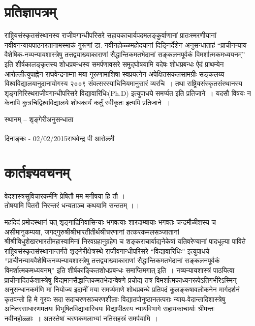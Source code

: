 \chapter{प्रतिज्ञापत्रम्}
\begin{small}
राष्ट्रियसंस्कृतसंस्थानस्य राजीवगान्धीपरिसरे सहायकाचार्यपदमलङ्कुर्वाणानां प्रातःस्मरणीयानां नवीवनन्यायपाठनरतानामस्माकं गुरूणां डा. नवीनहोळ्ळमहोदयानां दिङ्निर्देशेन अनुसन्धाताहं “प्राचीनन्याय-वैशेषिक-नव्यन्यायशास्त्रेषु तत्तद्व्याख्याकाराणां सैद्धान्तिकमतभेदानां सङ्कलनपूर्वकं विमर्शात्मकमध्ययनम्” इति शीर्षकालङ्कृतस्य शोधप्रबन्धस्य समर्पणावसरे समुद्घोषयामि यदेषः शोधप्रबन्धः ऐदं प्राथम्येन आरोल्लीत्युपाह्वेन राघवेन्द्रनाम्ना  मया गूरूणामाशिषा स्वप्रयत्नेन अपेक्षितसकलसामग्रीः सङ्कलय्य विश्वविद्यालयानुदानायोगस्य २००९ संवत्सरस्याधिनियमानुसारं व्यरचि~। तथा राष्ट्रियसंस्कृतसंस्थानस्य शृङ्गगिरिस्थराजीवगान्धीपरिसरे विद्यावारिधिः(Ph.D) इत्युपाधये समर्प्यत इति प्रतिजाने~। यदसौ विषयः न केनापि कुत्रचिद्विश्वविद्यालये शोधकार्यं कर्तुं स्वीकृतः इत्यपि प्रतिजाने~।
\bigskip

\noindent									
स्थानम् – शृङ्गेरी\hfill अनुसन्धाता\\ \\
दिनाङ्कः - 02/02/2015\hfill {\s राघवेन्द्र पी आरोल्ली}

\end{small}

\chapter{कार्तज्ञ्यवचनम्}

{\s वेदशास्त्रसुविचारकर्मणि प्रेषितौ मम मनीषया हि तौ ।\\
तोषयामि पितरौ निरन्तरं धन्यताञ्च कथयामि सन्ततम् ।।}

महदिदं प्रमोदस्थानं यत् शृङ्गाद्रिनिवासिन्याः भगवत्याः शारदाम्बायाः भगवतः चन्द्रमौळीशस्य च असीमानुकम्पया, जगद्गुरुश्रीश्रीभारतीतीर्थश्रीचरणानां तत्करकमलसञ्जातानां श्रीश्रीविधुशेखरभारतीमहास्वामिनां निरवग्रहानुग्रहेण च शङ्कराचार्याद्यनेकेषां यतिवरेण्यानां पादधूल्या पाविते राष्ट्रियसंस्कृतसंस्थानान्तर्गते शृङ्गेरीक्षेत्रस्थे राजीवगान्धीपरिसरे “विद्यावारिधिः” इत्युपाधये 	“प्राचीनन्यायवैशेषिकनव्यन्यायशास्त्रेषु तत्तद्व्याख्याकाराणां सैद्धान्तिकमतभेदानां सङ्कलनपूर्वकं विमर्शात्मकमध्ययनम्” इति शीर्षकाङ्कितशोधप्रबन्धः समाप्तिमगात् इति~। नव्यन्यायशास्त्रं पाठयित्वा प्राचीनादितर्कशास्त्रेषु विद्यमानसैद्धान्तिकमतभेदान्वेषणे प्रचोद्य तत्र विमर्शात्मकाध्यनरूपेऽतिगभीरेऽस्मिन्  अनुसन्धानकर्मणि  मां नियोज्य इदानीं मया समर्प्यमाणे शोधप्रबन्धे प्रतिपदं कूलङ्कषावलोकनेन मार्गदर्शनं कृतवन्तो हि मे गुरवः सदा सदाचरणसञ्चरणशीलाः विद्यातपोनुष्ठानतत्पराः न्याय-वेदान्तादिशास्त्रेषु अनितरसाधारणमतयः  विभूषितविद्यावारिधयः विद्यापीठस्य न्यायविभागे सहायकाचार्याः {\s श्रीमन्तः नवीनहोळ्ळाः}~। अतस्तेषां चरणकमलाभ्यां नतिसहस्रं समर्पयामि~।

